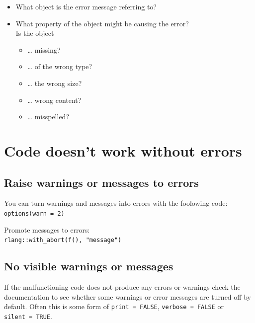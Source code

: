 \documentclass[]{book}
\providecommand{\tightlist}{%
  \setlength{\itemsep}{0pt}\setlength{\parskip}{0pt}}
\begin{document}
\begin{itemize}
\tightlist
\item
  What object is the error message referring to?\\
\item
  What property of the object might be causing the error?\\
  Is the object

  \begin{itemize}
  \tightlist
  \item
    \ldots{} missing?\\
  \item
    \ldots{} of the wrong type?\\
  \item
    \ldots{} the wrong size?\\
  \item
    \ldots{} wrong content?\\
  \item
    \ldots{} misspelled?
  \end{itemize}
\end{itemize}

\hypertarget{code-doesnt-work-without-errors}{%
\section{Code doesn't work without errors}\label{code-doesnt-work-without-errors}}

\hypertarget{raise-warnings-or-messages-to-errors}{%
\subsection{Raise warnings or messages to errors}\label{raise-warnings-or-messages-to-errors}}

You can turn warnings and messages into errors with the foolowing code:
\texttt{options(warn\ =\ 2)}

Promote messages to errors:\\
\texttt{rlang::with\_abort(f(),\ "message")}

\hypertarget{no-visible-warnings-or-messages}{%
\subsection{No visible warnings or messages}\label{no-visible-warnings-or-messages}}

If the malfunctioning code does not produce any errors or warnings check the documentation to see whether some warnings or error messages are turned off by default.
Often this is some form of \texttt{print\ =\ FALSE}, \texttt{verbose\ =\ FALSE} or \texttt{silent\ =\ TRUE}.
\end{document}
